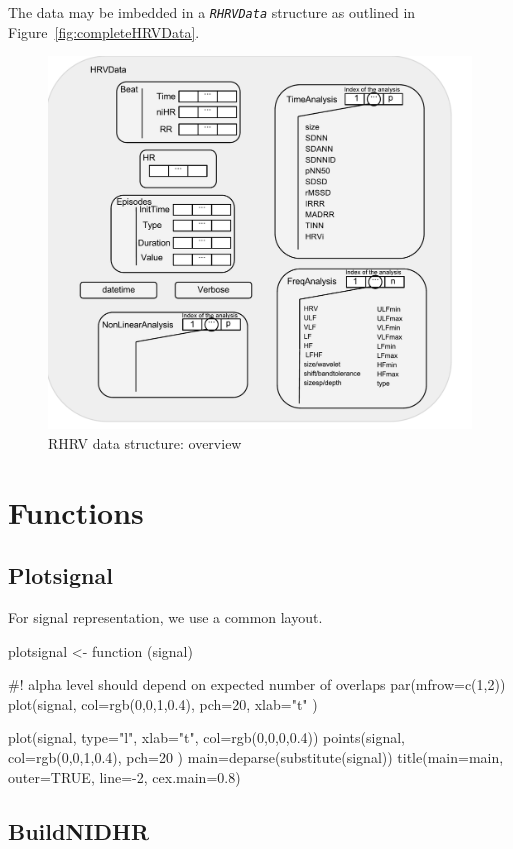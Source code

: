 \documentclass[a4paper, english, utf8]{amsart}
\newcommand{\figref}[1]{Figure\ \vref{#1}}
\newcommand\code[1]{\textsl{\texttt{#1}}}
\begin{document}
The data may be imbedded in a \code{RHRVData} structure as outlined in \figref{fig:completeHRVData}.


\begin{figure}[htbp]
\begin{center}
\includegraphics[width=0.8\linewidth]{../media/completeHRVData}
\caption{RHRV data structure: overview}
\label{fig:completeHRVData}
\end{center}
\end{figure}


\section{Functions}

\subsection{Plotsignal}
For signal representation, we use a common layout.
\begin{Schunk}
\begin{Sinput}
  plotsignal <- function (signal) {
  #! alpha level should depend on expected number of overlaps
  par(mfrow=c(1,2))
  plot(signal, col=rgb(0,0,1,0.4), pch=20, xlab="t" )
  
  plot(signal, type="l", 
  	 xlab="t", col=rgb(0,0,0,0.4))
  points(signal, col=rgb(0,0,1,0.4), pch=20 )
  main=deparse(substitute(signal))
  title(main=main, outer=TRUE, line=-2, cex.main=0.8)
  }
\end{Sinput}
\end{Schunk}
\subsection{BuildNIDHR}
\end{document}
